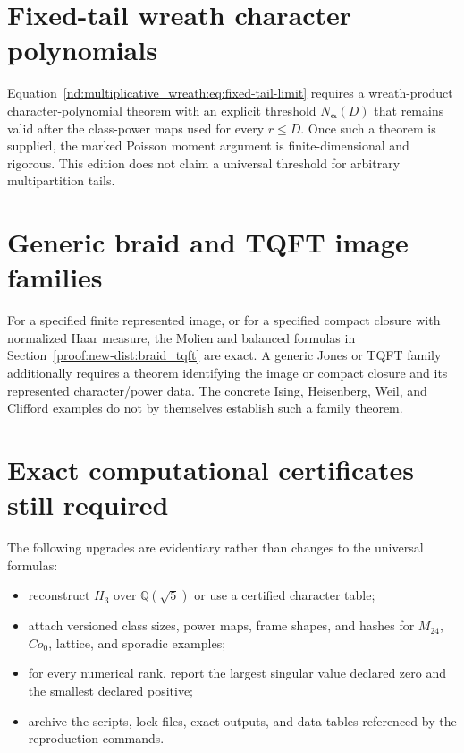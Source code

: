 \documentclass[10pt]{article}
\begin{document}
\section{Fixed-tail wreath character polynomials}
Equation~\eqref{nd:multiplicative_wreath:eq:fixed-tail-limit} requires a
wreath-product character-polynomial theorem with an explicit threshold
$N_{\boldsymbol\alpha}(D)$ that remains valid after the class-power maps used
for every $r\le D$. Once such a theorem is supplied, the marked Poisson
moment argument is finite-dimensional and rigorous. This edition does not
claim a universal threshold for arbitrary multipartition tails.

\section{Generic braid and TQFT image families}
For a specified finite represented image, or for a specified compact closure
with normalized Haar measure, the Molien and balanced formulas in
Section~\ref{proof:new-dist:braid_tqft} are exact. A generic Jones or TQFT
family additionally requires a theorem identifying the image or compact
closure and its represented character/power data. The concrete Ising,
Heisenberg, Weil, and Clifford examples do not by themselves establish such a
family theorem.

\section{Exact computational certificates still required}
The following upgrades are evidentiary rather than changes to the universal
formulas:
\begin{itemize}
\item reconstruct $H_3$ over $\mathbb Q(\sqrt5)$ or use a certified character
table;
\item attach versioned class sizes, power maps, frame shapes, and hashes for
$M_{24}$, $Co_0$, lattice, and sporadic examples;
\item for every numerical rank, report the largest singular value declared
zero and the smallest declared positive;
\item archive the scripts, lock files, exact outputs, and data tables referenced
by the reproduction commands.
\end{itemize}
\end{document}
